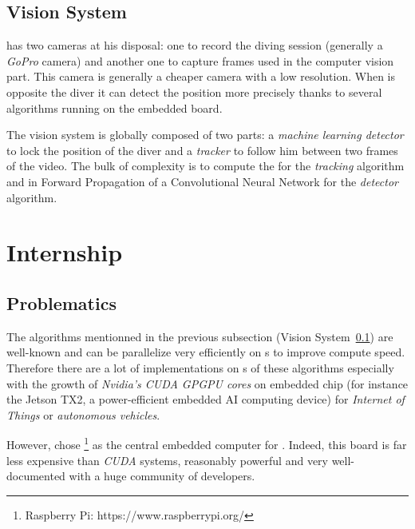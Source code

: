 \subsection{Vision System}

\label{Vision} %

\iBubble{} has two cameras at his disposal: one to record the diving session (generally a \emph{GoPro} camera) and another one to capture frames used in the computer vision part. This camera is generally a cheaper camera with a low resolution. When \iBubble{} is opposite the diver it can detect the position more precisely thanks to several algorithms running on the embedded board.

The vision system is globally composed of two parts: a \emph{machine learning detector} to lock the position of the diver and a \emph{tracker} to follow him between two frames of the video. The bulk of complexity is to compute the  for the \emph{tracking} algorithm and in Forward Propagation of a Convolutional Neural Network for the \emph{detector} algorithm.


\section{Internship}

\subsection{Problematics}

The algorithms mentionned in the previous subsection (Vision System~\ref{Vision}) are well-known and can be parallelize very efficiently on s to improve compute speed. Therefore there are a lot of implementations on s of these algorithms especially with the growth of \emph{Nvidia's CUDA GPGPU cores} on embedded chip (for instance the Jetson TX2, a power-efficient embedded AI computing device) for \emph{Internet of Things} or \emph{autonomous vehicles}.

However, \groupname{} chose \rasp\footnote{Raspberry Pi: https://www.raspberrypi.org/} as the central embedded computer for \iBubble. Indeed, this board is far less expensive than \emph{CUDA} systems, reasonably powerful and very well-documented with a huge community of developers.\par

